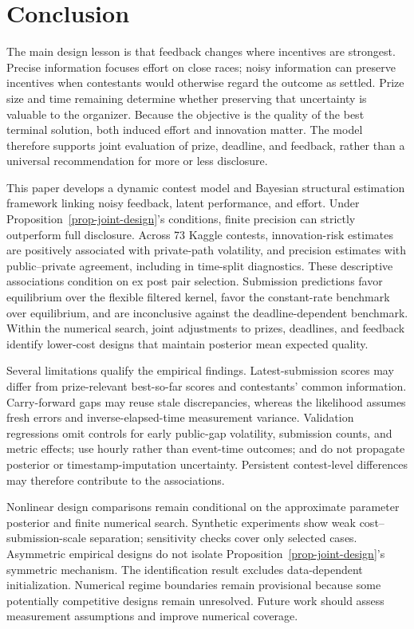 \documentclass[mnsc]{informs3}
\begin{document}
\section{Conclusion}

{The main design lesson is that feedback changes where incentives are strongest. Precise information focuses effort on close races; noisy information can preserve incentives when contestants would otherwise regard the outcome as settled. Prize size and time remaining determine whether preserving that uncertainty is valuable to the organizer. Because the objective is the quality of the best terminal solution, both induced effort and innovation matter. The model therefore supports joint evaluation of prize, deadline, and feedback, rather than a universal recommendation for more or less disclosure.}

{This paper develops a dynamic contest model and Bayesian structural estimation framework linking noisy feedback, latent performance, and effort. Under Proposition~\ref{prop-joint-design}'s conditions, finite precision can strictly outperform full disclosure. Across 73 Kaggle contests, innovation-risk estimates are positively associated with private-path volatility, and precision estimates with public--private agreement, including in time-split diagnostics. These descriptive associations condition on ex post pair selection. Submission predictions favor equilibrium over the flexible filtered kernel, favor the constant-rate benchmark over equilibrium, and are inconclusive against the deadline-dependent benchmark. Within the numerical search, joint adjustments to prizes, deadlines, and feedback identify lower-cost designs that maintain posterior mean expected quality.}

{Several limitations qualify the empirical findings. Latest-submission scores may differ from prize-relevant best-so-far scores and contestants' common information. Carry-forward gaps may reuse stale discrepancies, whereas the likelihood assumes fresh errors and inverse-elapsed-time measurement variance. Validation regressions omit controls for early public-gap volatility, submission counts, and metric effects; use hourly rather than event-time outcomes; and do not propagate posterior or timestamp-imputation uncertainty. Persistent contest-level differences may therefore contribute to the associations.}

{Nonlinear design comparisons remain conditional on the approximate parameter posterior and finite numerical search. Synthetic experiments show weak cost--submission-scale separation; sensitivity checks cover only selected cases. Asymmetric empirical designs do not isolate Proposition~\ref{prop-joint-design}'s symmetric mechanism. The identification result excludes data-dependent initialization. Numerical regime boundaries remain provisional because some potentially competitive designs remain unresolved. Future work should assess measurement assumptions and improve numerical coverage.}
\end{document}
